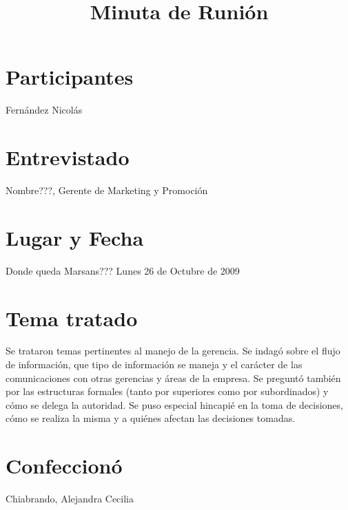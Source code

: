 \documentclass[12pt,a4paper,spanish]{article}
\begin{document}
\title{Minuta de Runi\'on}
\maketitle

\section{Participantes}
Fern\'{a}ndez Nicol\'{a}s


\section{Entrevistado}
Nombre???, Gerente de Marketing y Promoci\'on

\section{Lugar y Fecha}
Donde queda Marsans??? Lunes 26 de Octubre de 2009

\section{Tema tratado}
Se trataron temas pertinentes al manejo de la gerencia. Se indag\'o sobre el flujo de informaci\'on, que tipo de informaci\'on se maneja y el car\'acter de las comunicaciones con otras gerencias y \'areas de la empresa. Se pregunt\'o tambi\'en por las estructuras formales (tanto por superiores como por subordinados) y c\'omo se delega la autoridad. Se puso especial hincapi\'e en la toma de decisiones, c\'omo se realiza la misma y a qui\'enes afectan las decisiones tomadas.

\section{Confeccion\'o}
Chiabrando, Alejandra Cecilia
\end{document}
